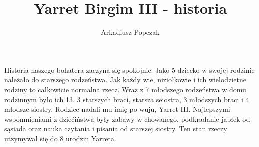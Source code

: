 \documentclass{article}
\title{Yarret Birgim III - historia}
\author{Arkadiusz Popczak}
\date{}
\begin{document}
    \maketitle

    Historia naszego bohatera zaczyna się spokojnie. Jako 5 dziecko w swojej rodzinie należało do starszego rodzeństwa. Jak każdy wie, niziołkowie i ich wielodzietne rodziny to całkowicie normalna rzecz. Wraz z 7 młodszego rodzeństwa w domu rodzinnym było ich 13. 3 starszych braci, starsza seiostra, 3 młodszych braci i 4 młodsze siostry. Rodzice nadali mu imię po wuju, Yarret III. Najlepszymi wspomnieniami z dziećiństwa były zabawy w chowanego, podkradanie jabłek od sąsiada oraz nauka czytania i pisania od starszej siostry. Ten stan rzeczy utzymywał się do 8 urodzin Yarreta. 


    
\end{document}
